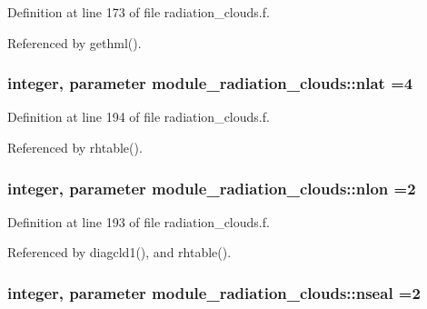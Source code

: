 Definition at line 173 of file radiation\+\_\+clouds.\+f.



Referenced by gethml().

\subsubsection[{\texorpdfstring{nlat}{nlat}}]{\setlength{\rightskip}{0pt plus 5cm}integer, parameter module\+\_\+radiation\+\_\+clouds\+::nlat =4\hspace{0.3cm}{\ttfamily [private]}}\hypertarget{group__module__radiation__clouds_gad4274cb223949e858ecc2e6346bed610}{}\label{group__module__radiation__clouds_gad4274cb223949e858ecc2e6346bed610}


Definition at line 194 of file radiation\+\_\+clouds.\+f.



Referenced by rhtable().

\subsubsection[{\texorpdfstring{nlon}{nlon}}]{\setlength{\rightskip}{0pt plus 5cm}integer, parameter module\+\_\+radiation\+\_\+clouds\+::nlon =2\hspace{0.3cm}{\ttfamily [private]}}\hypertarget{group__module__radiation__clouds_gab4d14edea12bbcda5361cad523386c7c}{}\label{group__module__radiation__clouds_gab4d14edea12bbcda5361cad523386c7c}


Definition at line 193 of file radiation\+\_\+clouds.\+f.



Referenced by diagcld1(), and rhtable().

\subsubsection[{\texorpdfstring{nseal}{nseal}}]{\setlength{\rightskip}{0pt plus 5cm}integer, parameter module\+\_\+radiation\+\_\+clouds\+::nseal =2\hspace{0.3cm}{\ttfamily [private]}}\hypertarget{group__module__radiation__clouds_gaaf2a6549a8c42b9eae3d40d21d1e9532}{}\label{group__module__radiation__clouds_gaaf2a6549a8c42b9eae3d40d21d1e9532}


